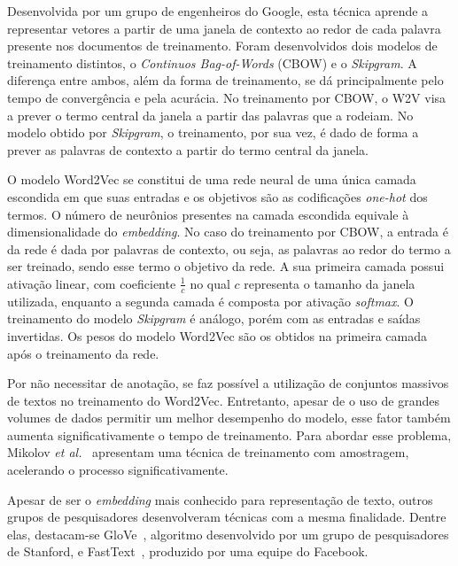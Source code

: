 Desenvolvida por um grupo de engenheiros do Google, esta técnica aprende a representar vetores a partir de uma janela de
contexto ao redor de cada palavra presente nos documentos de treinamento.
Foram desenvolvidos dois modelos de treinamento distintos, o \textit{Continuos Bag-of-Words} (CBOW) e o
\textit{Skipgram}.
A diferença entre ambos, além da forma de treinamento, se dá principalmente pelo tempo de convergência e pela acurácia.
No treinamento por CBOW, o W2V visa a prever o termo central da janela a partir das palavras que a rodeiam.
No modelo obtido por \textit{Skipgram}, o treinamento, por sua vez, é dado de forma a prever as palavras de contexto a
partir do termo central da janela.

O modelo Word2Vec se constitui de uma rede neural de uma única camada escondida em que suas entradas e os objetivos são
as codificações \textit{one-hot} dos termos.
O número de neurônios presentes na camada escondida equivale à dimensionalidade do \textit{embedding}.
No caso do treinamento por CBOW, a entrada é da rede é dada por palavras de contexto, ou seja, as palavras ao redor do
termo a ser treinado, sendo esse termo o objetivo da rede.
A sua primeira camada possui ativação linear, com coeficiente $\frac{1}{c}$ no qual $c$ representa o tamanho da janela
utilizada, enquanto a segunda camada é composta por ativação \textit{softmax}.
O treinamento do modelo \textit{Skipgram} é análogo, porém com as entradas e saídas invertidas.
Os pesos do modelo Word2Vec são os obtidos na primeira camada após o treinamento da rede.

Por não necessitar de anotação, se faz possível a utilização de conjuntos massivos de textos no treinamento do Word2Vec.
Entretanto, apesar de o uso de grandes volumes de dados permitir um melhor desempenho do modelo, esse fator também
aumenta significativamente o tempo de treinamento.
Para abordar esse problema, Mikolov \textit{et al.}~\cite{mikolov13b} apresentam uma técnica de treinamento com
amostragem, acelerando o processo significativamente.

Apesar de ser o \textit{embedding} mais conhecido para representação de texto, outros grupos de pesquisadores
desenvolveram técnicas com a mesma finalidade.
Dentre elas, destacam-se GloVe~\cite{pennington14}, algoritmo desenvolvido por um grupo de pesquisadores de Stanford, e
FastText~\cite{bojanowski16}, produzido por uma equipe do Facebook.
